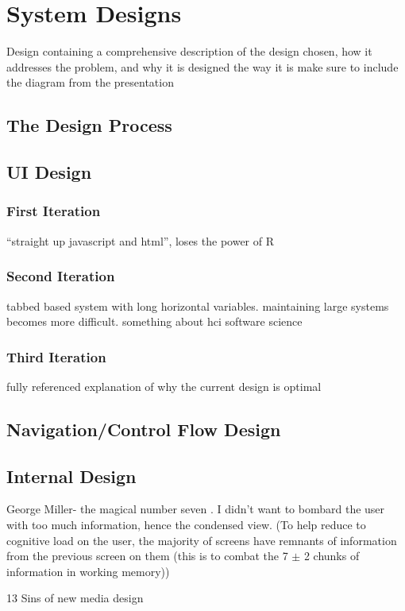 \section{System Designs}
{\color{red} Design containing a comprehensive description of the design chosen, how it addresses the problem, and why it is designed the way it is}
{\color{red}  make sure to include the diagram from the presentation}

\subsection{The Design Process}
{\color{red}  }



\subsection{UI Design}
{\color{red}  }


	\subsubsection{First Iteration}
	{\color{red} ``straight up javascript and html'', loses the power of R }



	\subsubsection{Second Iteration}
	{\color{red} tabbed based system with long horizontal variables. maintaining large systems becomes more difficult. something about hci software science }


	\subsubsection{Third Iteration}		
	{\color{red} fully referenced explanation of why the current design is optimal }


\subsection{Navigation/Control Flow Design}		
{\color{red}  }


\subsection{Internal Design}
{\color{red}  }


{\color{red} 
George Miller- the magical number seven \cite{miller1956magical}.
I didn't want to bombard the user with too much information, hence the condensed view. (To help reduce to cognitive load on the user, the majority of screens have remnants of information from the previous screen on them (this is to combat the 7 $\pm$ 2 chunks of information in working memory))}


{\color{red} 
13 Sins of new media design}
